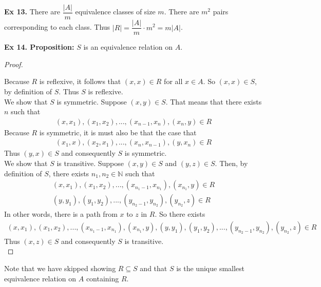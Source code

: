 \documentclass{article}
\begin{document}
\noindent \textbf{Ex 13.} There are $\dfrac{|A|}{m}$ equivalence classes of size $m$. There are $m^2$ pairs corresponding to each class. Thus $|R|=\dfrac{|A|}{m} \cdot{} m^2=m|A|$.\\

\newpage

\noindent \textbf{Ex 14. Proposition:} $S$ is an equivalence relation on $A$.

\begin{proof}
$ $\newline

\noindent Because $R$ is reflexive, it follows that $(x,x) \in R$ for all $x \in A$. So $(x,x) \in S$, by definition of $S$. Thus $S$ is reflexive.\\

\noindent We show that $S$ is symmetric. Suppose $(x, y) \in S$. That means that there exists $n$ such that
\begin{align*}
(x,x_1), (x_1, x_2), ..., (x_{n-1}, x_{n}), (x_{n}, y) \in R
\end{align*}
Because $R$ is symmetric, it is must also be that the case that
\begin{align*}
(x_1,x), (x_2, x_1), ..., (x_n, x_{n-1}), (y, x_{n}) \in R
\end{align*}
Thus $(y, x) \in S$ and consequently $S$ is symmetric.\\

\noindent We show that $S$ is transitive. Suppose $(x, y) \in S$ and $(y, z) \in S$. Then, by definition of $S$, there exists $n_1, n_2 \in \mathbb{N}$ such that
\begin{align*}
(x,x_1), (x_1, x_2), ..., (x_{n_1-1}, x_{n_1}), (x_{n_1}, y) \in R\\
(y,y_1), (y_1, y_2), ..., (y_{n_2-1}, y_{n_2}), (y_{n_2}, z) \in R
\end{align*}
In other words, there is a path from $x$ to $z$ in $R$. So there exists
\begin{align*}
(x,x_1), (x_1, x_2), ..., (x_{n_1-1}, x_{n_1}), (x_{n_1}, y), (y,y_1), (y_1, y_2), ..., (y_{n_2-1}, y_{n_2}), (y_{n_2}, z) \in R
\end{align*}
Thus $(x, z) \in S$ and consequently $S$ is transitive.\\
\end{proof}

\noindent Note that we have skipped showing $R \subseteq S$ and that $S$ is the unique smallest equivalence relation on $A$ containing $R$.\\
\end{document}
